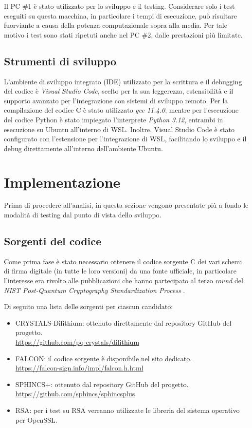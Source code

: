 Il PC \#1 è stato utilizzato per lo sviluppo e il testing. Considerare solo i test eseguiti su questa macchina, in particolare i tempi di esecuzione, può risultare fuorviante a causa della potenza computazionale sopra alla media. Per tale motivo i test sono stati ripetuti anche nel PC \#2, dalle prestazioni più limitate.

\subsection{Strumenti di sviluppo}
L'ambiente di sviluppo integrato (IDE) utilizzato per la scrittura e il debugging del codice è \textit{Visual Studio Code}, scelto per la sua leggerezza, estensibilità e il supporto avanzato per l'integrazione con sistemi di sviluppo remoto.
Per la compilazione del codice C è stato utilizzato \textit{gcc 11.4.0}, mentre per l'esecuzione del codice Python è stato impiegato l'interprete \textit{Python 3.12}, entrambi in esecuzione su Ubuntu all'interno di WSL. Inoltre, Visual Studio Code è stato configurato con l'estensione per l'integrazione di WSL, facilitando lo sviluppo e il debug direttamente all'interno dell'ambiente Ubuntu.

\section{Implementazione}

Prima di procedere all'analisi, in questa sezione vengono presentate più a fondo le modalità di testing dal punto di vista dello sviluppo.

\subsection{Sorgenti del codice}

Come prima fase è stato necessario ottenere il codice sorgente C dei vari schemi di firma digitale (in tutte le loro versioni) da una fonte ufficiale, in particolare l'interesse era rivolto alle pubblicazioni che hanno partecipato al terzo \textit{round} del \textit{NIST Post-Quantum 
Cryptography Standardization Process} \cite{nist-pqc}. 

Di seguito una lista delle sorgenti per ciascun candidato:
\begin{itemize}
    \item CRYSTALS-Dilithium: ottenuto direttamente dal repository GitHub del progetto. \\
            \url{https://github.com/pq-crystals/dilithium} \cite{crystals-dilithium-github}
    \item FALCON: il codice sorgente è disponibile nel sito dedicato. \\
            \url{https://falcon-sign.info/impl/falcon.h.html} \cite{falcon-github}
    \item SPHINCS+: ottenuto dal repository GitHub del progetto. \\
            \url{https://github.com/sphincs/sphincsplus} \cite{sphincs-plus-github}
    \item RSA: per i test su RSA verranno utilizzate le libreria del sistema operativo per OpenSSL.
\end{itemize}

